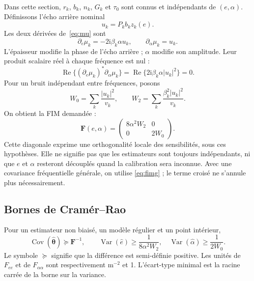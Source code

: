 \documentclass[11pt,a4paper]{article}
\newcommand{\ii}{\mathrm{i}}
\newcommand{\Reel}{\operatorname{Re}}
\newcommand{\Var}{\operatorname{Var}}
\newcommand{\Cov}{\operatorname{Cov}}
\begin{document}
Dans cette section, $r_k$, $b_k$, $n_k$, $G_k$ et $\tau_0$ sont connus
et indépendants de $(e,\alpha)$. Définissons l'écho arrière nominal
\begin{equation}
 u_k=P_kb_kz_k(e).
\end{equation}
Les deux dérivées de~\eqref{eq:mu} sont
\begin{equation}\label{eq:deriv}
 \boxed{\partial_e\mu_k=-2\ii\beta_k\alpha u_k,\qquad
        \partial_\alpha\mu_k=u_k.}
\end{equation}
L'épaisseur modifie la phase de l'écho arrière ; $\alpha$ modifie son
amplitude. Leur produit scalaire réel à chaque fréquence est nul :
\begin{equation}
 \Reel\{(\partial_e\mu_k)^*\partial_\alpha\mu_k\}
 =\Reel\{2\ii\beta_k\alpha|u_k|^2\}=0.
\end{equation}
Pour un bruit indépendant entre fréquences, posons
\begin{equation}
 W_0=\sum_k\frac{|u_k|^2}{v_k},\qquad
 W_2=\sum_k\frac{\beta_k^2|u_k|^2}{v_k}.
\end{equation}
On obtient la FIM demandée :
\begin{equation}\label{eq:fimfermee}
 \boxed{\mathbf F(e,\alpha)=
 \begin{pmatrix}
 8\alpha^2W_2 & 0\\
 0 & 2W_0
 \end{pmatrix}.}
\end{equation}
Cette diagonale exprime une orthogonalité locale des sensibilités, sous
ces hypothèses. Elle ne signifie pas que les estimateurs sont toujours
indépendants, ni que $e$ et $\alpha$ resteront découplés quand la calibration
sera inconnue. Avec une covariance fréquentielle générale, on utilise
\eqref{eq:fimg} ; le terme croisé ne s'annule plus nécessairement.

\subsection{Bornes de Cramér--Rao}
Pour un estimateur non biaisé, un modèle régulier et un point intérieur,
\begin{equation}\label{eq:crb}
 \Cov(\widehat{\boldsymbol\theta})\succeq\mathbf F^{-1},\qquad
 \boxed{\Var(\hat e)\geq\frac{1}{8\alpha^2W_2},\quad
        \Var(\hat\alpha)\geq\frac{1}{2W_0}.}
\end{equation}
Le symbole $\succeq$ signifie que la différence est semi-définie positive.
Les unités de $F_{ee}$ et de $F_{\alpha\alpha}$ sont respectivement
$\mathrm{m}^{-2}$ et 1. L'écart-type minimal est la racine carrée de la borne
sur la variance.
\end{document}
